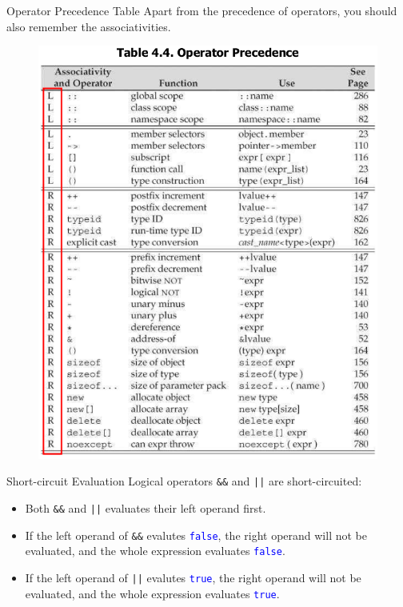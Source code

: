 \documentclass{beamer}
\newcommand{\blue}[1]{\textcolor{blue}{#1}}
\begin{document}
\begin{frame}{Operator Precedence Table}
    Apart from the precedence of operators, you should also remember the associativities.
    \begin{figure}[h]
        \centering
        \includegraphics[height=0.7\textheight]{figures/precedence.png}
    \end{figure}
\end{frame}

\begin{frame}{Short-circuit Evaluation}
    Logical operators \texttt{\&\&} and \texttt{||} are short-circuited:
    \begin{itemize}
        \item Both \texttt{\&\&} and \texttt{||} evaluates their left operand first.
        \item If the left operand of \texttt{\&\&} evalutes \blue{\texttt{false}}, the right operand will not be evaluated, and the whole expression evaluates \blue{\texttt{false}}.
        \item If the left operand of \texttt{||} evalutes \blue{\texttt{true}}, the right operand will not be evaluated, and the whole expression evaluates \blue{\texttt{true}}.
    \end{itemize}
\end{frame}
\end{document}
